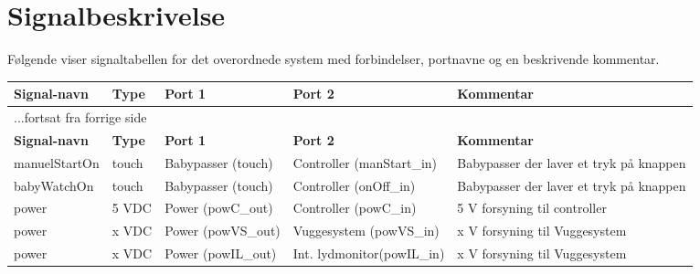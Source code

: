 

\section{Signalbeskrivelse} \label{overordnet:signalbeskrivelse}

Følgende viser  signaltabellen for det overordnede system  med forbindelser, portnavne og en beskrivende kommentar.

\begin{center}
\label{table:Signaltabel}
\begin{longtable}{|p{}|p{}|p{}|p{}|p{3cm}|}
\hline
\textbf{Signal-navn}	&\textbf{Type} 		&\textbf{Port 1} 	&\textbf{Port 2} 			&\textbf{Kommentar} \\ \hline
\endfirsthead
\multicolumn{5}{l}{...fortsat fra forrige side} \\ \hline 
\textbf{Signal-navn}	&\textbf{Type} 		&\textbf{Port 1} 	&\textbf{Port 2} 			&\textbf{Kommentar} \\ \hline
\endhead


manuelStartOn
&touch
&Babypasser \newline (touch)
&Controller \newline (manStart\_in)
&Babypasser der laver et tryk på knappen
\\\hline

babyWatchOn
&touch
&Babypasser \newline (touch)
&Controller \newline (onOff\_in)
&Babypasser der laver et tryk på knappen
\\\hline

power
&5 VDC
&Power \newline(powC\_out)
&Controller \newline(powC\_in)
&5 V forsyning til controller
\\\hline

power
&x VDC
&Power \newline(powVS\_out)
&Vuggesystem \newline(powVS\_in)
&x V forsyning til Vuggesystem
\\\hline

power
&x VDC
&Power \newline(powIL\_out)
&Int. lydmonitor\newline(powIL\_in)
&x V forsyning til Vuggesystem
\\\hline


\end{longtable}
\end{center}
